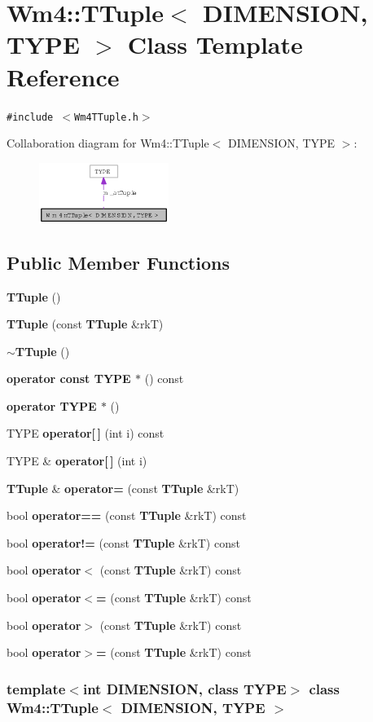 \section{Wm4::TTuple$<$ DIMENSION, TYPE $>$ Class Template Reference}
\label{classWm4_1_1TTuple}
{\tt \#include $<$Wm4TTuple.h$>$}

Collaboration diagram for Wm4::TTuple$<$ DIMENSION, TYPE $>$:\begin{figure}[H]
\begin{center}
\leavevmode
\includegraphics[width=119pt]{classWm4_1_1TTuple__coll__graph}
\end{center}
\end{figure}
\subsection*{Public Member Functions}
\begin{CompactItemize}
\item 
{\bf TTuple} ()
\item 
{\bf TTuple} (const {\bf TTuple} \&rk\-T)
\item 
{\bf $\sim$TTuple} ()
\item 
{\bf operator const TYPE $\ast$} () const
\item 
{\bf operator TYPE $\ast$} ()
\item 
TYPE {\bf operator[$\,$]} (int i) const
\item 
TYPE \& {\bf operator[$\,$]} (int i)
\item 
{\bf TTuple} \& {\bf operator=} (const {\bf TTuple} \&rk\-T)
\item 
bool {\bf operator==} (const {\bf TTuple} \&rk\-T) const
\item 
bool {\bf operator!=} (const {\bf TTuple} \&rk\-T) const
\item 
bool {\bf operator$<$} (const {\bf TTuple} \&rk\-T) const
\item 
bool {\bf operator$<$=} (const {\bf TTuple} \&rk\-T) const
\item 
bool {\bf operator$>$} (const {\bf TTuple} \&rk\-T) const
\item 
bool {\bf operator$>$=} (const {\bf TTuple} \&rk\-T) const
\end{CompactItemize}
\subsubsection*{template$<$int DIMENSION, class TYPE$>$ class Wm4::TTuple$<$ DIMENSION, TYPE $>$}




